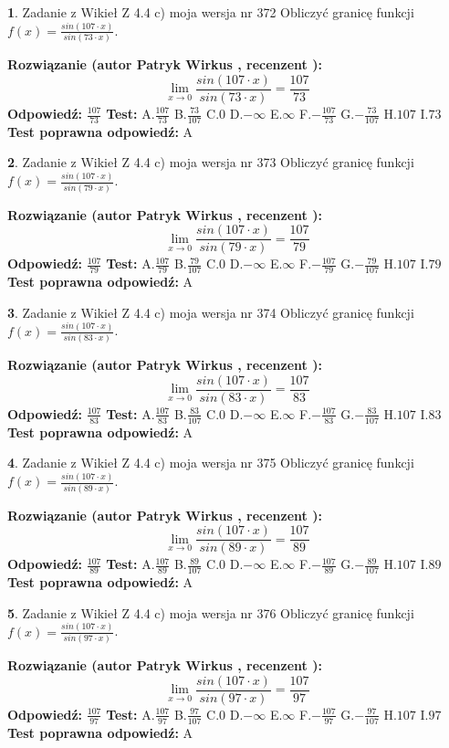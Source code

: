 \documentclass[12pt, a4paper]{article}
\theoremstyle{definition} %
\newtheorem{zad}{}
\newcommand{\zadStart}[1]{\begin{zad}#1\newline}
\newcommand{\zadStop}{\end{zad}}
\newcommand{\rozwStart}[2]{\noindent \textbf{Rozwiązanie (autor #1 , recenzent #2): }\newline}
\newcommand{\rozwStop}{\newline}
\newcommand{\odpStart}{\noindent \textbf{Odpowiedź:}\newline}
\newcommand{\odpStop}{\newline}
\newcommand{\testStart}{\noindent \textbf{Test:}\newline}
\newcommand{\testStop}{\newline}
\newcommand{\kluczStart}{\noindent \textbf{Test poprawna odpowiedź:}\newline}
\newcommand{\kluczStop}{\newline}
\begin{document}
\zadStart{Zadanie z Wikieł Z 4.4 c) moja wersja nr 372}
Obliczyć granicę funkcji $f(x)=\frac{sin(107\cdot x)}{sin(73\cdot x)}$.
\zadStop
\rozwStart{Patryk Wirkus}{}
$$\lim\limits_{x\to 0}\frac{sin(107\cdot x)}{sin(73\cdot x)}=
\frac{107}{73}$$
\rozwStop
\odpStart
$\frac{107}{73}$
\odpStop
\testStart
A.$\frac{107}{73}$
B.$\frac{73}{107}$
C.$0$
D.$-\infty$
E.$\infty$
F.$-\frac{107}{73}$
G.$-\frac{73}{107}$
H.$107$
I.$73$
\testStop
\kluczStart
A
\kluczStop



\zadStart{Zadanie z Wikieł Z 4.4 c) moja wersja nr 373}
Obliczyć granicę funkcji $f(x)=\frac{sin(107\cdot x)}{sin(79\cdot x)}$.
\zadStop
\rozwStart{Patryk Wirkus}{}
$$\lim\limits_{x\to 0}\frac{sin(107\cdot x)}{sin(79\cdot x)}=
\frac{107}{79}$$
\rozwStop
\odpStart
$\frac{107}{79}$
\odpStop
\testStart
A.$\frac{107}{79}$
B.$\frac{79}{107}$
C.$0$
D.$-\infty$
E.$\infty$
F.$-\frac{107}{79}$
G.$-\frac{79}{107}$
H.$107$
I.$79$
\testStop
\kluczStart
A
\kluczStop



\zadStart{Zadanie z Wikieł Z 4.4 c) moja wersja nr 374}
Obliczyć granicę funkcji $f(x)=\frac{sin(107\cdot x)}{sin(83\cdot x)}$.
\zadStop
\rozwStart{Patryk Wirkus}{}
$$\lim\limits_{x\to 0}\frac{sin(107\cdot x)}{sin(83\cdot x)}=
\frac{107}{83}$$
\rozwStop
\odpStart
$\frac{107}{83}$
\odpStop
\testStart
A.$\frac{107}{83}$
B.$\frac{83}{107}$
C.$0$
D.$-\infty$
E.$\infty$
F.$-\frac{107}{83}$
G.$-\frac{83}{107}$
H.$107$
I.$83$
\testStop
\kluczStart
A
\kluczStop



\zadStart{Zadanie z Wikieł Z 4.4 c) moja wersja nr 375}
Obliczyć granicę funkcji $f(x)=\frac{sin(107\cdot x)}{sin(89\cdot x)}$.
\zadStop
\rozwStart{Patryk Wirkus}{}
$$\lim\limits_{x\to 0}\frac{sin(107\cdot x)}{sin(89\cdot x)}=
\frac{107}{89}$$
\rozwStop
\odpStart
$\frac{107}{89}$
\odpStop
\testStart
A.$\frac{107}{89}$
B.$\frac{89}{107}$
C.$0$
D.$-\infty$
E.$\infty$
F.$-\frac{107}{89}$
G.$-\frac{89}{107}$
H.$107$
I.$89$
\testStop
\kluczStart
A
\kluczStop



\zadStart{Zadanie z Wikieł Z 4.4 c) moja wersja nr 376}
Obliczyć granicę funkcji $f(x)=\frac{sin(107\cdot x)}{sin(97\cdot x)}$.
\zadStop
\rozwStart{Patryk Wirkus}{}
$$\lim\limits_{x\to 0}\frac{sin(107\cdot x)}{sin(97\cdot x)}=
\frac{107}{97}$$
\rozwStop
\odpStart
$\frac{107}{97}$
\odpStop
\testStart
A.$\frac{107}{97}$
B.$\frac{97}{107}$
C.$0$
D.$-\infty$
E.$\infty$
F.$-\frac{107}{97}$
G.$-\frac{97}{107}$
H.$107$
I.$97$
\testStop
\kluczStart
A
\kluczStop
\end{document}
